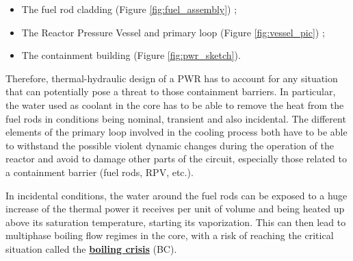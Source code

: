\begin{itemize}
\item The fuel rod cladding (Figure \ref{fig:fuel_assembly}) ;
\item The Reactor Pressure Vessel and primary loop (Figure \ref{fig:vessel_pic}) ;
\item The containment building (Figure \ref{fig:pwr_sketch}).
\end{itemize}


Therefore, thermal-hydraulic design of a PWR has to account for any situation that can potentially pose a threat to those containment barriers. In particular, the water used as coolant in the core has to be able to remove the heat from the fuel rods in conditions being nominal, transient and also incidental. The different elements of the primary loop involved in the cooling process both have to be able to withstand the possible violent dynamic changes during the operation of the reactor and avoid to damage other parts of the circuit, especially those related to a containment barrier (fuel rods, RPV, etc.).

%
%
%
%
%

In incidental conditions, the water around the fuel rods can be exposed to a huge increase of the thermal power it receives per unit of volume and being heated up above its saturation temperature, starting its vaporization. This can then lead to multiphase boiling flow regimes in the core, with a risk of reaching the critical situation called the \textbf{\underline{boiling crisis}} (BC).

